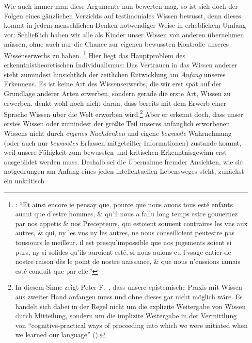 Wie auch immer man diese Argumente nun bewerten mag, so ist
sich  doch der Folgen eines gänzlichen Verzichts auf
testimoniales Wissen bewusst, denn dieses kommt in jedem menschlichen Denken
notwendiger Weise in erheblichem Umfang vor: Schließlich haben wir alle als
Kinder unser Wissen von anderen übernehmen müssen, ohne auch nur die Chance zur
eigenen bewussten Kontrolle unseres Wissenserwerbs zu haben.
\footnote{\cite[Vgl.][VI: 13.1--12]{Descartes:OeuvresdeDescartes1983}:
\enquote{Et ainsi encore ie pensay que, pource que nous auons tous est{\'e} enfants auant que
  d'estre hommes, {\&} qu'il nous a fallu long temps estre gouuernez
  par nos appetis {\&} nos Precepteurs, qui estoient souuent
  contraires les vns aux autres, {\&} qui, ny les vns ny les autres, ne nous
  conseilloient peutestre pas tousiours le meilleur, il est presqu'impossible
  que nos jugements soient si purs, ny si solides qu'ils auroient est{\'e}, si
  nous auions eu l'vsage entier de nostre raison d{\`e}s le point de nostre
  naissance, {\&} que nous n'eussions iamais est{\'e} conduit que par elle.}}
Hier liegt das Hauptproblem des erkenntnistheoretischen Individualismus: Das
Vertrauen in das Wissen anderer steht zumindest hinsichtlich der zeitlichen
Entwicklung am \emph{Anfang} unseres Erkennens. Es ist keine Art des
Wissenserwerbs, die wir erst spät auf der Grundlage anderer Arten erwerben,
sondern gerade die erste Art, Wissen zu erwerben.  denkt wohl
noch nicht daran, dass bereits mit dem Erwerb einer Sprache Wissen über die Welt
erworben wird.\footnote{In diesem Sinne zeigt Peter
F.~\textcite{Strawson:KnowingfromWords1994}, dass unsere epistemische Praxis mit
Wissen aus zweiter Hand anfangen muss und ohne dieses gar nicht möglich wäre. Es
handelt sich dabei in der Regel nicht um die explizite Weitergabe von Wissen
durch Mitteilung, sondern um die implizite Weitergabe in der Vermittlung von
\enquote{cognitive-practical ways of proceeding into which we were initiated
when we learned our language} (\cite[][415]{McDowell:KnowledgebyHearsay1994}).}
Aber er erkennt doch, dass unser erstes Wissen oder zumindest der größte Teil
unseres anfänglich erworbenen Wissens nicht durch \emph{eigenes Nachdenken} und
eigene \emph{bewusste} Wahrnehmung (oder auch nur \emph{bewusstes} Erfassen
mitgeteilter Informationen) zustande kommt, weil unsere Fähigkeit zum bewussten
und kritischen Erkenntnisgewinn erst ausgebildet werden muss. Deshalb sei die Übernahme fremder Ansichten, wie sie notgedrungen am
Anfang eines jeden intellektuellen Lebensweges steht, zunächst ein unkritisch
